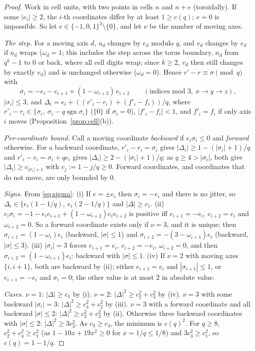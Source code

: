 \documentclass[11pt]{amsart}
\theoremstyle{definition}
\theoremstyle{plain}
\DeclareMathOperator{\sgn}{sgn}
\begin{document}
\begin{proof}
Work in cell units, with two points in cells $n$ and $n+e$ (toroidally). If some $|e_i|\ge2$, the $i$-th coordinates differ by at least $1\ge c(q)$; $e=0$ is impossible. So let $e\in\{-1,0,1\}^3\setminus\{0\}$, and let $\nu$ be the number of moving axes.

\emph{The step.} For a moving axis $d$, $u_d$ changes by $e_d$ modulo $q$, and $v_d$ changes by $e_d$ if $u_d$ wraps ($\omega_d=1$; this includes the step across the torus boundary, $n_d$ from $q^k-1$ to $0$ or back, where all cell digits wrap; since $k\ge2$, $v_d$ then still changes by exactly $e_d$) and is unchanged otherwise ($\omega_d=0$). Hence $r'-r\equiv\sigma\pmod q$ with
\begin{equation}\label{eq:sigma}
\sigma_i=-e_i-e_{i+1}+(1-\omega_{i+2})\,e_{i+2}\qquad(\text{indices mod }3,\ x\to y\to z),
\end{equation}
$|\sigma_i|\le3$, and $\Delta_i=e_i+((r'_i-r_i)+(f'_i-f_i))/q$, where $r'_i-r_i\in\{\sigma_i,\ \sigma_i-q\sgn\sigma_i\}$ ($\{0\}$ if $\sigma_i=0$), $|f'_i-f_i|<1$, and $f'_i=f_i$ if only axis $i$ moves (Proposition~\ref{prop:cell}(b)).

\emph{Per-coordinate bound.} Call a moving coordinate \emph{backward} if $e_i\sigma_i\le0$ and \emph{forward} otherwise. For a backward coordinate, $r'_i-r_i=\sigma_i$ gives $|\Delta_i|\ge1-(|\sigma_i|+1)/q$ and $r'_i-r_i=\sigma_i+qe_i$ gives $|\Delta_i|\ge2-(|\sigma_i|+1)/q$; as $q\ge4>|\sigma_i|$, both give $|\Delta_i|\ge c_{|\sigma_i|+1}$ with $c_j:=1-j/q\ge0$. Forward coordinates, and coordinates that do not move, are only bounded by $0$.

\emph{Signs.} From \eqref{eq:sigma}:
(i) If $e=\pm e_i$ then $\sigma_i=-e_i$ and there is no jitter, so $\Delta_i\in\{e_i(1-1/q),\ e_i(2-1/q)\}$ and $|\Delta|\ge c_1$.
(ii) $e_i\sigma_i=-1-e_ie_{i+1}+(1-\omega_{i+2})e_ie_{i+2}$ is positive iff $e_{i+1}=-e_i$, $e_{i+2}=e_i$ and $\omega_{i+2}=0$. So a forward coordinate exists only if $\nu=3$, and it is unique; then $\sigma_{i+1}=(1-\omega_i)e_i$ (backward, $|\sigma|\le1$) and $\sigma_{i+2}=-(3-\omega_{i+1})e_i$ (backward, $|\sigma|\le3$).
(iii) $|\sigma_i|=3$ forces $e_{i+1}=e_i$, $e_{i+2}=-e_i$, $\omega_{i+2}=0$, and then $\sigma_{i+2}=(1-\omega_{i+1})e_i$: backward with $|\sigma|\le1$.
(iv) If $\nu=2$ with moving axes $\{i,i+1\}$, both are backward by (ii); either $e_{i+1}=e_i$ and $|\sigma_{i+1}|\le1$, or $e_{i+1}=-e_i$ and $\sigma_i=0$; the other value is at most $2$ in absolute value.

\emph{Cases.} $\nu=1$: $|\Delta|\ge c_1$ by (i). $\nu=2$: $|\Delta|^2\ge c_2^2+c_3^2$ by (iv). $\nu=3$ with some backward $|\sigma_i|=3$: $|\Delta|^2\ge c_4^2+c_2^2$ by (iii). $\nu=3$ with a forward coordinate and all backward $|\sigma|\le2$: $|\Delta|^2\ge c_2^2+c_3^2$ by (ii). Otherwise three backward coordinates with $|\sigma|\le2$: $|\Delta|^2\ge3c_3^2$. As $c_3\ge c_4$, the minimum is $c(q)^2$. For $q\ge8$, $c_2^2+c_4^2\ge c_1^2$ (as $1-10x+19x^2\ge0$ for $x=1/q\le1/8$) and $3c_3^2\ge c_1^2$, so $c(q)=1-1/q$.
\end{proof}
\end{document}
